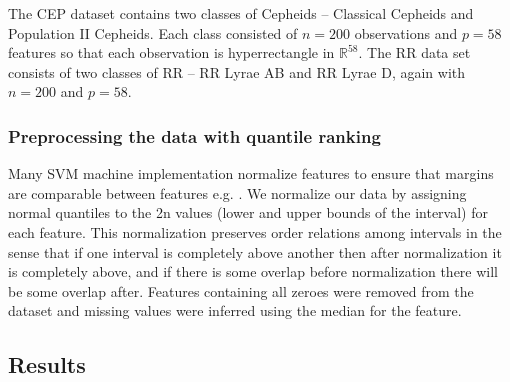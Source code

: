 \documentclass[10pt]{article}
\theoremstyle{definition}
\begin{document}
The CEP dataset contains two classes of Cepheids --  Classical Cepheids and Population II Cepheids.  Each class consisted of $n=200$ observations and $p=58$ features so that each observation is hyperrectangle in $\mathbb{R}^{58}$. The RR data set consists of two classes of RR --  RR Lyrae AB and RR Lyrae D, again with $n=200$ and $p=58$.

\subsubsection{Preprocessing the data with quantile ranking}
Many SVM machine implementation normalize features to ensure that margins are comparable between features e.g. \cite{dimitriadou2011package}. We normalize our data by assigning normal quantiles to the 2n values (lower and upper bounds of the interval) for each feature. This normalization preserves order relations among intervals in the sense that if one interval is completely above another then after normalization it is completely above, and if there is some overlap before normalization there will be some overlap after. Features containing all zeroes were removed from the dataset and missing values were inferred using the median for the feature.

\subsection{Results}
\end{document}
